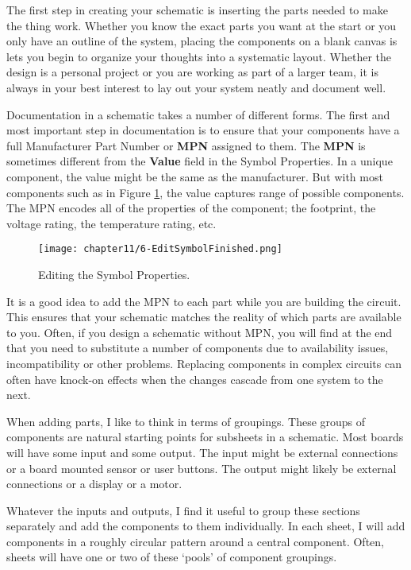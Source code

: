 The first step in creating your schematic is inserting the parts needed to make the thing work.
Whether you know the exact parts you want at the start or you only have an outline of the system, placing the components on a blank canvas is lets you begin to organize your thoughts into a systematic layout.
Whether the design is a personal project or you are working as part of a larger team, it is always in your best interest to lay out your system neatly and document well.

Documentation in a schematic takes a number of different forms.
The first and most important step in documentation is to ensure that your components have a full Manufacturer Part Number or \textbf{MPN} assigned to them.
The \textbf{MPN} is sometimes different from the \textbf{Value} field in the Symbol Properties.
In a unique component, the value might be the same as the manufacturer.
But with most components such as in Figure \ref{fig:symbprop}, the value captures range of possible components.
The MPN encodes all of the properties of the component; the footprint, the voltage rating, the temperature rating, etc.
\begin{figure}
	\texttt{[image: chapter11/6-EditSymbolFinished.png]}
	\caption[Symbol Properties]{
		Editing the Symbol Properties.
		}
	\label{fig:symbprop}
\end{figure}

It is a good idea to add the MPN to each part while you are building the circuit.
This ensures that your schematic matches the reality of which parts are available to you.
Often, if you design a schematic without MPN, you will find at the end that you need to substitute a number of components due to availability issues, incompatibility or other problems.
Replacing components in complex circuits can often have knock-on effects when the changes cascade from one system to the next.

When adding parts, I like to think in terms of groupings.
These groups of components are natural starting points for subsheets in a schematic.
Most boards will have some input and some output.
The input might be external connections or a board mounted sensor or user buttons.
The output might likely be external connections or a display or a motor.

Whatever the inputs and outputs, I find it useful to group these sections separately and add the components to them individually.
In each sheet, I will add components in a roughly circular pattern around a central component.
Often, sheets will have one or two of these `pools' of component groupings.

